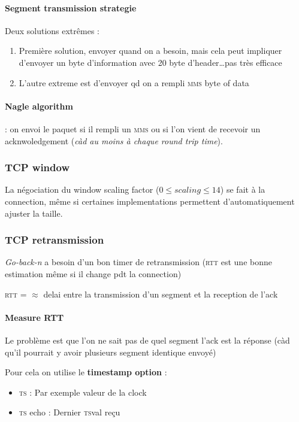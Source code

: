 \paragraph{Segment transmission strategie}

Deux solutions extrêmes :
\begin{enumerate}
    \item Première solution, envoyer quand on a besoin, mais cela peut impliquer d'envoyer
        un byte d'information avec 20 byte d'header\ldots pas très efficace
    \item L'autre extreme est d'envoyer qd on a rempli \textsc{mms} byte of data
\end{enumerate}

\paragraph{Nagle  algorithm}  :   on  envoi  le  paquet   si  il  rempli
un  \textsc{mms}  ou  si  l'on  vient  de  recevoir  un  acknwoledgement
(\textit{càd au moins à chaque round trip time}).

\subsubsection{TCP window}

La négociation du  window scaling factor ($0 \leq scaling  \leq 14$) se
fait  à la  connection, même  si certaines  implementations permettent
d'automatiquement ajuster la taille.

\subsubsection{TCP retransmission}
\textit{Go-back-n} a besoin d'un bon timer de retransmission (\textsc{rtt} est une
bonne estimation même si il change pdt la connection)

\textsc{rtt} = $\approx$ delai entre la transmission d'un segment et la reception de l'ack
\paragraph{Measure RTT }
Le problème est que l'on ne sait pas de quel segment l'ack est la réponse (càd qu'il pourrait
y avoir plusieurs segment identique envoyé)

Pour cela on utilise le \textbf{timestamp option} :
\begin{itemize}
    \item \textsc{ts} : Par exemple valeur de la clock
    \item \textsc{ts} echo : Dernier \textsc{ts}val reçu\\
\end{itemize}


